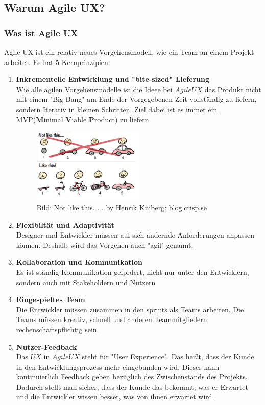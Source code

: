 \documentclass[12pt,a4paper]{scrartcl}
\begin{document}
\subsection{Warum Agile UX?}

\subsubsection{Was ist Agile UX}

Agile UX ist ein relativ neues Vorgehensmodell, wie ein Team an einem Projekt arbeitet. Es hat 5 Kernprinzipien:
\begin{enumerate}
\item \textbf{Inkrementelle Entwicklung und "bite-sized" Lieferung}\\
Wie alle agilen Vorgehensmodelle ist die Ideee bei $Agile UX$ das Produkt nicht mit einem "Big-Bang" am Ende der 	Vorgegebenen Zeit vollständig zu liefern, sondern Iterativ in kleinen Schritten. Ziel dabei ist es immer ein MVP(\textbf{M}inimal \textbf{V}iable \textbf{P}roduct) zu liefern.
\begin{figure}[h]
    \centering
    \includegraphics[width=0.5\textwidth]{images/IterativesVorgehen}
    \caption{Bild: Not like this. . . by Henrik Kniberg: \url{blog.crisp.se}}
\end{figure}

\item \textbf{Flexibiltät und Adaptivität}\\
Designer und Entwickler müssen auf sich ändernde Anforderungen anpassen können. Deshalb wird das Vorgehen auch "agil" genannt.

\item \textbf{Kollaboration und Kommunikation}\\
Es ist ständig Kommunikation gefprdert, nicht nur unter den Entwicklern, sondern auch mit Stakeholdern und Nutzern

\item \textbf{Eingespieltes Team}\\
Die Entwickler müssen zusammen in den sprints als Teams arbeiten. Die Teams müssen kreativ, schnell und anderen Teammitgliedern rechenschaftspflichtig sein.

\item \textbf{Nutzer-Feedback}\\
Das $UX$ in $Agile UX$ steht für "User Experience". Das heißt, dass der Kunde in den Entwicklungsprozess mehr eingebunden wird. Dieser kann kontinuierlich Feedback geben bezüglich des Zwischenstands des Projekts. Dadurch stellt man sicher, dass der Kunde das bekommt, was er Erwartet und die Entwickler wissen besser, was von ihnen erwartet wird. 
\end{enumerate}
\end{document}
